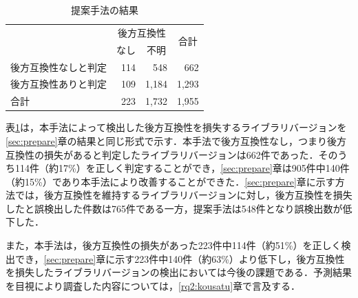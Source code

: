 \documentclass[submit]{ipsj}
\begin{document}
\begin{table}[t]
\centering
\caption{提案手法の結果}
\label{fig:result}
\begin{tabular}{l|r|r|r}
\hline
 & \multicolumn{2}{c|}{後方互換性}  & \multicolumn{1}{c}{\multirow{2}{*}{合計}} \\ \cline{2-3}
 & \multicolumn{1}{c|}{なし} & \multicolumn{1}{c|}{不明} & \multicolumn{1}{c}{} \\ \hline
 後方互換性なしと判定      & 114 & 548 & 662 \\ \hline 
 後方互換性ありと判定      & 109 & 1,184 & 1,293 \\ \hline 
 合計              & 223 & 1,732 & 1,955 \\ \hline
\end{tabular}
\end{table}

表\ref{fig:result}は，本手法によって検出した後方互換性を損失するライブラリバージョンを\ref{sec:prepare}章の結果と同じ形式で示す．本手法で後方互換性なし，つまり後方互換性の損失があると判定したライブラリバージョンは662件であった．そのうち114件（約17\%）を正しく判定することができ，\ref{sec:prepare}章は905件中140件（約15\%）であり本手法により改善することができた．\ref{sec:prepare}章に示す方法では，後方互換性を維持するライブラリバージョンに対し，後方互換性を損失したと誤検出した件数は765件である一方，提案手法は548件となり誤検出数が低下した．

また，本手法は，後方互換性の損失があった223件中114件（約51\%）を正しく検出でき，\ref{sec:prepare}章に示す223件中140件（約63\%）より低下し，後方互換性を損失したライブラリバージョンの検出においては今後の課題である．予測結果を目視により調査した内容については，\ref{rq2:kousatu}章で言及する．





\end{document}
